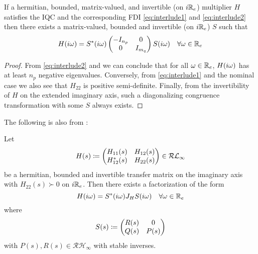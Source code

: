 \begin{thm}\label{thm:IQCinertia} If a hermitian, bounded, matrix-valued, and invertible (on $i\mathbb{R}_e$) multiplier $H$ satisfies the 
IQC and the corresponding FDI \eqref{eq:interlude1} and \eqref{eq:interlude2} then there exists a matrix-valued, bounded and 
invertible (on $i\mathbb{R}_e$) $S$ such that 
\[
H(i\omega) = S^*(i\omega)\begin{pmatrix}-I_{n_p}&0\\0&I_{m_q}\end{pmatrix}S(i\omega) \quad \forall\omega\in\mathbb{R}_e
\]
\end{thm}
\begin{proof} From \eqref{eq:interlude2} and  we can conclude that
for all $\omega\in\mathbb{R}_e$, $H(i\omega)$ has at least $n_p$ negative eigenvalues. Conversely, from
\eqref{eq:interlude1} and the nominal case we also see that $H_{22}$ is positive semi-definite. 
Finally, from the invertibility of $H$ on the extended imaginary axis, such a diagonalizing 
congruence transformation with some $S$ always exists. 
\end{proof}
The following is also from \cite{goh96}:
\begin{thm} Let 
\[
H(s) \coloneqq \begin{pmatrix}H_{11}(s)&H_{12}(s)\\ H^*_{12}(s)&H_{22}(s)\end{pmatrix} \in\mathcal{RL}_\infty
\]
be a hermitian, bounded and invertible transfer matrix on the imaginary axis with $H_{22}(s)\succ 0$ on $i\mathbb{R}_e$. 
Then there exists a factorization of the form
\[
H(i\omega) = S^*(i\omega)J_HS(i\omega) \quad \forall\omega\in\mathbb{R}_e
\]
where
\[
S(s) \coloneqq \begin{pmatrix}R(s)&0\\ Q(s)&P(s)\end{pmatrix}
\]
with $P(s),R(s)\in\mathcal{RH}_\infty$ with stable inverses.
\end{thm}

